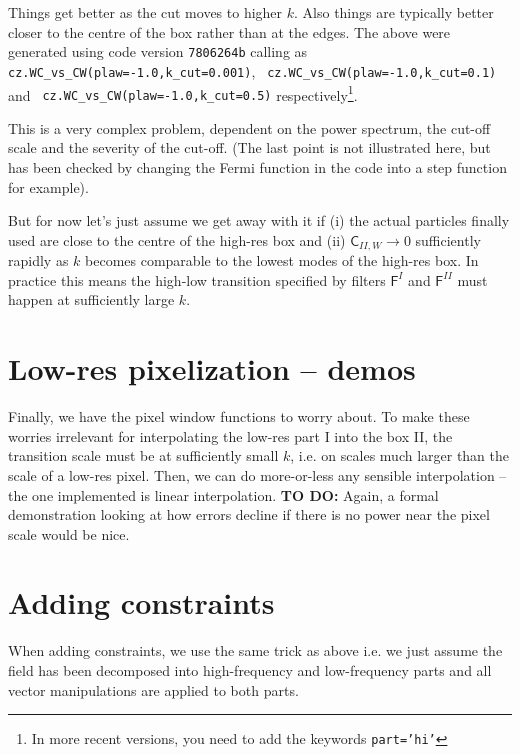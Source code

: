 \documentclass[11pt,a4paper,preprint]{aastex}
\begin{document}
Things get better as the cut moves to higher $k$. Also things are
typically better closer to the centre of the box rather than at the
edges.  The above were generated using code version {\tt 7806264b}
calling as {\tt cz.WC\_vs\_CW(plaw=-1.0,k\_cut=0.001)}, {\tt
  cz.WC\_vs\_CW(plaw=-1.0,k\_cut=0.1)} and {\tt
  cz.WC\_vs\_CW(plaw=-1.0,k\_cut=0.5)} respectively\footnote{In more recent
  versions, you need to add the keywords {\tt part='hi'}}.

This is a very complex problem, dependent on the power spectrum, the
cut-off scale and the severity of the cut-off. (The last point is not
illustrated here, but has been checked by changing the Fermi function
in the code into a step function for example).

But for now let's just assume we get
away with it if (i) the actual particles finally used are close to the
centre of the high-res box and (ii) $\mathsf{C}_{II,W} \to 0$
sufficiently rapidly as $k$ becomes comparable to the lowest modes of
the high-res box. In practice this means the high-low transition
specified by filters $\mathsf{F}^I$ and $\mathsf{F}^{II}$ must happen
at sufficiently large $k$.



\section{Low-res pixelization -- demos}\label{sec:low-res-pixelization}

Finally, we have the pixel window functions to worry about. To make
these worries irrelevant for interpolating the low-res part I into the
box II, the transition scale must be at sufficiently small $k$,
i.e. on scales much larger than the scale of a low-res pixel.  Then,
we can do more-or-less any sensible interpolation -- the one
implemented is linear interpolation. {\bf TO DO: } Again, a formal
demonstration looking at how errors decline if there is no power near
the pixel scale would be nice.

\section{Adding constraints}

When adding constraints, we use the same trick as above i.e. we just assume
the field has been decomposed into high-frequency and low-frequency parts and
all vector manipulations are applied to both parts.
\end{document}
